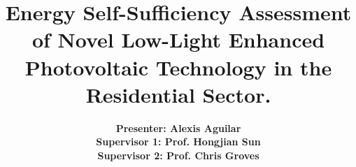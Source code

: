 \title[Energy Self-Suffiency with Low-Light Enhanced PV]{Energy Self-Sufficiency Assessment of Novel Low-Light Enhanced Photovoltaic Technology in the Residential Sector.}



\author{%
  \textbf{Presenter: Alexis Aguilar} \\
  \textbf{Supervisor 1: Prof. Hongjian Sun}\\  %
  \textbf{Supervisor 2: Prof. Chris Groves}\\ %
}

\date{}
